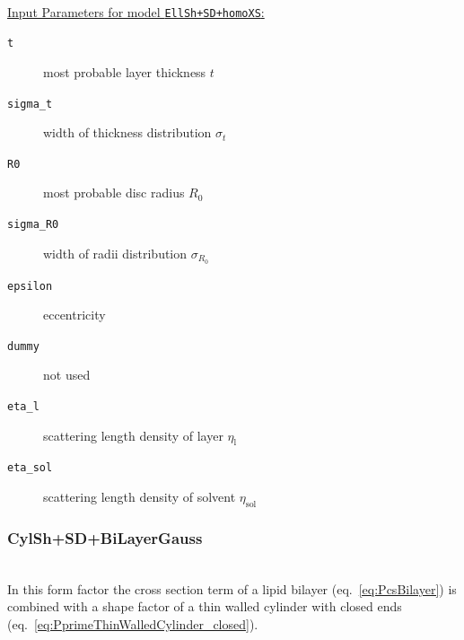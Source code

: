 \hspace{1pt}\\
\underline{Input Parameters for model \texttt{EllSh+SD+homoXS}:}\\
\begin{description}
\item[\texttt{t}] most probable layer thickness $t$
\item[\texttt{sigma\_t}] width of thickness distribution $\sigma_t$
\item[\texttt{R0}] most probable disc radius $R_0$
\item[\texttt{sigma\_R0}] width of radii distribution $\sigma_{R_0}$
\item[\texttt{epsilon}] eccentricity
\item[\texttt{dummy}] not used
\item[\texttt{eta\_l}] scattering length density of layer $\eta_\mathrm{l}$
\item[\texttt{eta\_sol}] scattering length density of solvent $\eta_\mathrm{sol}$
\end{description}


\vspace{5mm}

\noindent
\subsubsection{CylSh+SD+BiLayerGauss} ~\\

\noindent
In this form factor the cross section term of a lipid bilayer (eq.\ \ref{eq:PcsBilayer}) is combined with a shape factor of a thin walled cylinder with closed ends (eq.\ \ref{eq:PprimeThinWalledCylinder_closed}).

\vspace{5mm}

